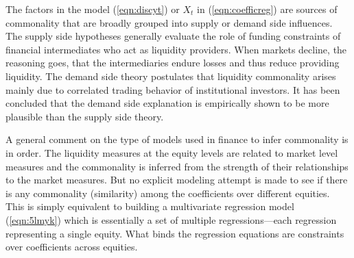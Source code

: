 The factors in the model (\ref{eqn:discyt}) or $X_t$ in (\ref{eqn:coefficreg}) are sources of commonality that are broadly grouped into supply or demand side influences. The supply side hypotheses generally evaluate the role of funding constraints of financial intermediates who act as liquidity providers. When markets decline, the reasoning goes, that the intermediaries endure losses and thus reduce providing liquidity. The demand side theory postulates that liquidity commonality arises mainly due to correlated trading behavior of institutional investors. It has been concluded that the demand side explanation is empirically shown to be more plausible than the supply side theory. 


A general comment on the type of models used in finance to infer commonality is in order. The liquidity measures at the equity levels are related to market level measures and the commonality is inferred from the strength of their relationships to the market measures. But no explicit modeling attempt is made to see if there is any commonality (similarity) among the coefficients over different equities. This is simply equivalent to building a multivariate regression model (\ref{eqn:5lmyk}) which is essentially a set of multiple regressions---each regression representing a single equity. What binds the regression equations are constraints over coefficients across equities. 


